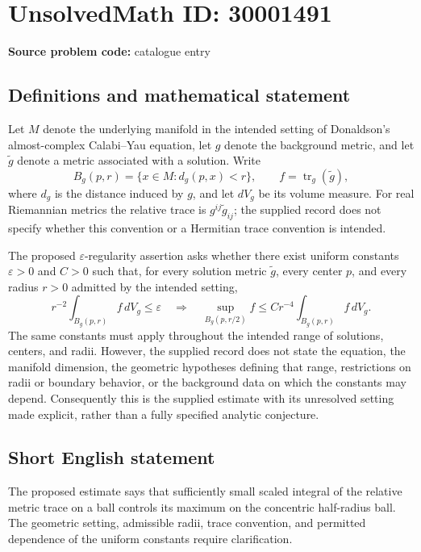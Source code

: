 \documentclass[11pt]{article}
\begin{document}
\section*{UnsolvedMath ID: 30001491}
\textbf{Source problem code:} catalogue entry
\subsection{Definitions and mathematical statement}
Let \(M\) denote the underlying manifold in the intended setting of Donaldson's almost-complex Calabi--Yau equation, let \(g\) denote the background metric, and let \(\widetilde g\) denote a metric associated with a solution. Write
\[
B_g(p,r)=\{x\in M:d_g(p,x)<r\},\qquad f=\operatorname{tr}_g(\widetilde g),
\]
where \(d_g\) is the distance induced by \(g\), and let \(dV_g\) be its volume measure. For real Riemannian metrics the relative trace is \(g^{ij}\widetilde g_{ij}\); the supplied record does not specify whether this convention or a Hermitian trace convention is intended.

The proposed \(\varepsilon\)-regularity assertion asks whether there exist uniform constants \(\varepsilon>0\) and \(C>0\) such that, for every solution metric \(\widetilde g\), every center \(p\), and every radius \(r>0\) admitted by the intended setting,
\[
r^{-2}\int_{B_g(p,r)} f\,dV_g\leq\varepsilon
\quad\Longrightarrow\quad
\sup_{B_g(p,r/2)} f
\leq C r^{-4}\int_{B_g(p,r)} f\,dV_g.
\]
The same constants must apply throughout the intended range of solutions, centers, and radii. However, the supplied record does not state the equation, the manifold dimension, the geometric hypotheses defining that range, restrictions on radii or boundary behavior, or the background data on which the constants may depend. Consequently this is the supplied estimate with its unresolved setting made explicit, rather than a fully specified analytic conjecture.
\subsection{Short English statement}
The proposed estimate says that sufficiently small scaled integral of the relative metric trace on a ball controls its maximum on the concentric half-radius ball. The geometric setting, admissible radii, trace convention, and permitted dependence of the uniform constants require clarification.
\end{document}
